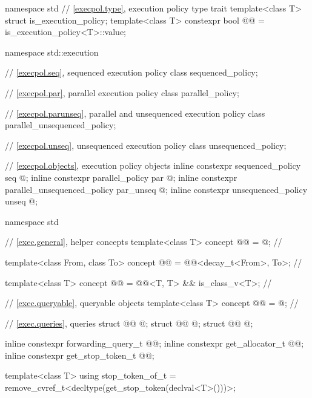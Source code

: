%
\begin{codeblock}
namespace std {
  // \ref{execpol.type}, execution policy type trait
  template<class T> struct is_execution_policy;
  template<class T> constexpr bool @@ = is_execution_policy<T>::value;
}

namespace std::execution {
  // \ref{execpol.seq}, sequenced execution policy
  class sequenced_policy;

  // \ref{execpol.par}, parallel execution policy
  class parallel_policy;

  // \ref{execpol.parunseq}, parallel and unsequenced execution policy
  class parallel_unsequenced_policy;

  // \ref{execpol.unseq}, unsequenced execution policy
  class unsequenced_policy;

  // \ref{execpol.objects}, execution policy objects
  inline constexpr sequenced_policy            seq{ @\unspec@ };
  inline constexpr parallel_policy             par{ @\unspec@ };
  inline constexpr parallel_unsequenced_policy par_unseq{ @\unspec@ };
  inline constexpr unsequenced_policy          unseq{ @\unspec@ };
}

namespace std {
  // \ref{exec.general}, helper concepts
  template<class T>
    concept @@ = @\seebelownc@;                          // \expos

  template<class From, class To>
    concept @@ = @@<decay_t<From>, To>;             // \expos

  template<class T>
    concept @@ = @@<T, T> && is_class_v<T>;      // \expos

  // \ref{exec.queryable}, queryable objects
  template<class T>
    concept @@ = @\seebelownc@;                              // \expos

  // \ref{exec.queries}, queries
  struct @@ { @\unspec@ };
  struct @@ { @\unspec@ };
  struct @@ { @\unspec@ };

  inline constexpr forwarding_query_t @@{};
  inline constexpr get_allocator_t @@{};
  inline constexpr get_stop_token_t @@{};

  template<class T>
    using stop_token_of_t = remove_cvref_t<decltype(get_stop_token(declval<T>()))>;

}
\end{codeblock}
